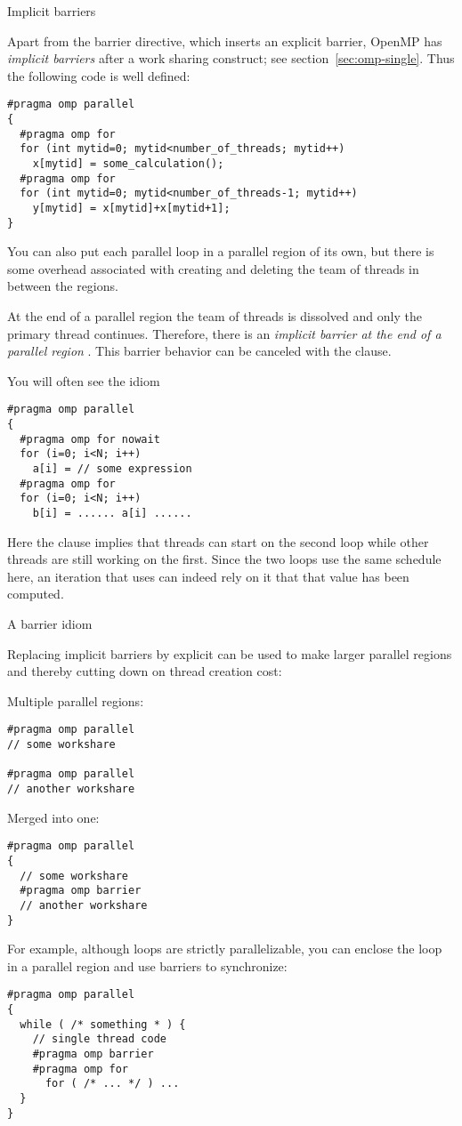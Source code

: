  {Implicit barriers}
\label{sec:ompbarrierimpl}

Apart from the barrier directive, which inserts an explicit barrier,
OpenMP has \emph{implicit barriers} after
a work sharing construct; see section~\ref{sec:omp-single}.
Thus the following code is well defined:
\begin{lstlisting}[language=omp]
#pragma omp parallel 
{
  #pragma omp for
  for (int mytid=0; mytid<number_of_threads; mytid++)
    x[mytid] = some_calculation();
  #pragma omp for
  for (int mytid=0; mytid<number_of_threads-1; mytid++)
    y[mytid] = x[mytid]+x[mytid+1];
}
\end{lstlisting}

You can also put each parallel loop in a parallel region of its own,
but there is some overhead associated with creating and deleting the
team of threads in between the regions.

At the end of a parallel region the team of threads is dissolved and
only the primary thread continues. Therefore, there is an
\emph{implicit barrier at the end of a parallel region}%
.
This barrier behavior can be canceled with the 
clause.

You will often see the idiom
\begin{lstlisting}[language=omp]
#pragma omp parallel
{
  #pragma omp for nowait
  for (i=0; i<N; i++)
    a[i] = // some expression
  #pragma omp for
  for (i=0; i<N; i++)
    b[i] = ...... a[i] ......
\end{lstlisting}
Here the  clause implies that threads can start on the second loop
while other threads are still working on the first. Since the two loops use the same
schedule here, an iteration that uses  can indeed rely on it that that 
value has been computed.

 {A barrier idiom}

Replacing implicit barriers by explicit can be used to
make larger parallel regions and thereby cutting down
on thread creation cost:
\begin{multicols}{2}
Multiple parallel regions:
\begin{lstlisting}[language=omp]
#pragma omp parallel
// some workshare

#pragma omp parallel
// another workshare
\end{lstlisting}
\columnbreak
Merged into one:
\begin{lstlisting}[language=omp]
#pragma omp parallel
{
  // some workshare
  #pragma omp barrier
  // another workshare
}
\end{lstlisting}
\end{multicols}
For example, although  loops are strictly parallelizable,
you can enclose the loop in a parallel region and use barriers
to synchronize:
\begin{lstlisting}[language=omp]
#pragma omp parallel
{
  while ( /* something * ) {
    // single thread code
    #pragma omp barrier
    #pragma omp for
      for ( /* ... */ ) ...
  }
}
\end{lstlisting}

